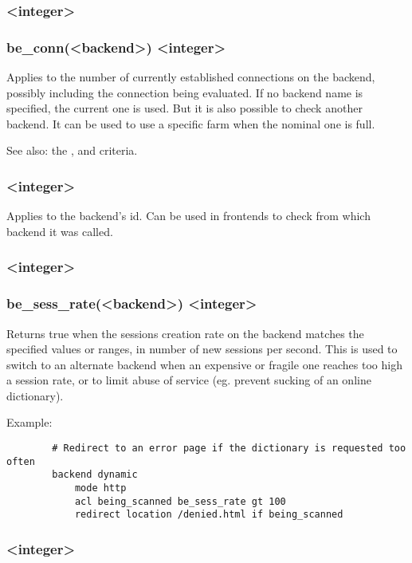 \subsubsection[be\_conn]{ <integer>}
\subsubsection*{be\_conn(<backend>) <integer>}
  Applies to the number of currently established connections on the backend,
  possibly including the connection being evaluated. If no backend name is
  specified, the current one is used. But it is also possible to check another
  backend. It can be used to use a specific farm when the nominal one is full.

See also: the ,  and  criteria.

\subsubsection[be\_id]{ <integer>}
  Applies to the backend's id. Can be used in frontends to check from which
  backend it was called.

\subsubsection[be\_sess\_rate]{ <integer>}
\subsubsection*{be\_sess\_rate(<backend>) <integer>}
  Returns true when the sessions creation rate on the backend matches the
  specified values or ranges, in number of new sessions per second. This is
  used to switch to an alternate backend when an expensive or fragile one
  reaches too high a session rate, or to limit abuse of service (eg. prevent
  sucking of an online dictionary).

  Example:
  \begin{verbatim}
        # Redirect to an error page if the dictionary is requested too often
        backend dynamic
            mode http
            acl being_scanned be_sess_rate gt 100
            redirect location /denied.html if being_scanned
  \end{verbatim}

\subsubsection[connslots]{ <integer>}
